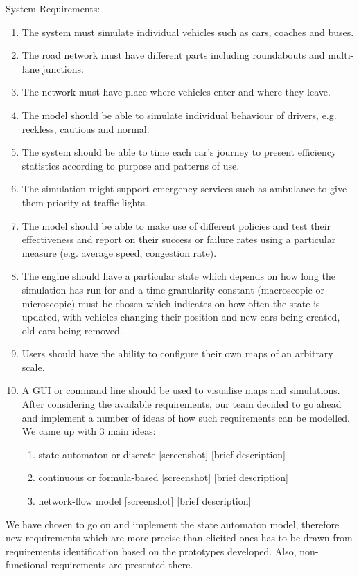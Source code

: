 \documentclass[]{article}
\begin{document}
System Requirements:
\begin{enumerate}

\item The system must simulate individual vehicles such as cars, coaches and buses.
\item The road network must have different parts including roundabouts and multi-lane junctions. 
\item The network must have place where vehicles enter and where they leave.
\item The model should be able to simulate individual behaviour of drivers, e.g. reckless, cautious and normal. 
\item The system should be able to time each car’s journey to present efficiency statistics according to purpose and patterns of use. 
\item The simulation might support emergency services such as ambulance to give them priority at traffic lights.
\item The model should be able to make use of different policies and test their effectiveness and report on their success or failure rates using a particular measure (e.g. average speed, congestion rate).
\item The engine should have a particular state which depends on how long the simulation has run for and a time granularity constant (macroscopic or microscopic) must be chosen which indicates on how often the state is updated, with vehicles changing their position and new cars being created, old cars being removed.  
\item Users should have the ability to configure their own maps of an arbitrary scale. 
\item A GUI or command line should be used to visualise maps and simulations.
After considering the available requirements, our team decided to go ahead and implement a number of ideas of how such requirements can be modelled. We came up with 3 main ideas:
\begin{enumerate}

\item state automaton or discrete
[screenshot] [brief description]
\item continuous or formula-based
[screenshot] [brief description]
\item network-flow model
[screenshot] [brief description]
\end{enumerate}
\end{enumerate}

We have chosen to go on and implement the state automaton model, therefore new requirements which are more precise than elicited ones has to be drawn from requirements identification based on the prototypes developed. Also, non-functional requirements are presented there. 
\end{document}
